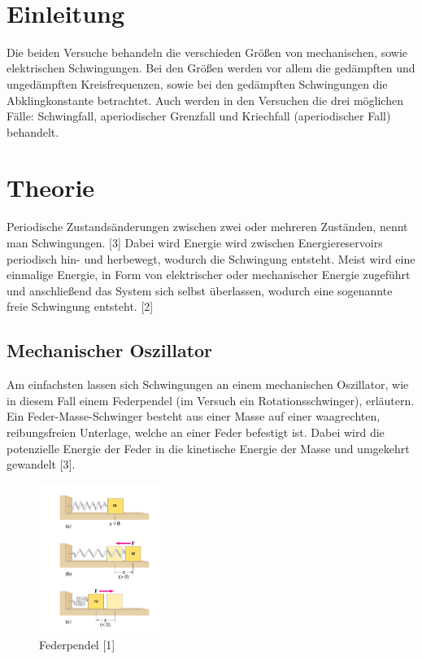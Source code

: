 \documentclass[a4paper]{scrartcl}
\def\header#1#2{
  \begin{center}
    {\Large #1}\\
    {#2}
  \end{center}
}
\numberwithin{equation}{subsection}
\begin{document}
\vspace{10pt}
\header{\HEADDING}{\SUBHEADDING}

\tableofcontents

\newpage

\section{Einleitung}
Die beiden Versuche behandeln die verschieden Größen von mechanischen, sowie elektrischen Schwingungen.
Bei den Größen werden vor allem die gedämpften und ungedämpften Kreisfrequenzen, sowie bei den gedämpften Schwingungen die Abklingkonstante betrachtet.
Auch werden in den Versuchen die drei möglichen Fälle: Schwingfall, aperiodischer Grenzfall und Kriechfall (aperiodischer Fall) behandelt.

\newpage

\section{Theorie}
Periodische Zustandsänderungen zwischen zwei oder mehreren Zuständen, nennt man Schwingungen. [3]
Dabei wird Energie wird zwischen Energiereservoirs periodisch hin- und herbewegt, wodurch die Schwingung entsteht.
Meist wird eine einmalige Energie, in Form von elektrischer oder
mechanischer Energie zugeführt und anschließend das System sich selbst überlassen, wodurch eine sogenannte freie Schwingung entsteht. [2]

\subsection{Mechanischer Oszillator}
Am einfachsten lassen sich Schwingungen an einem mechanischen Oszillator, wie in diesem Fall einem Federpendel (im Versuch ein Rotationsschwinger), erläutern. Ein Feder-Masse-Schwinger besteht aus einer Masse auf einer waagrechten, reibungsfreien Unterlage, welche an einer Feder befestigt ist. Dabei wird die potenzielle Energie der Feder in die kinetische Energie der Masse und umgekehrt gewandelt [3].

\begin{figure}[H]
\includegraphics[width=4cm]{Grafik_Federpendel}
\centering
\caption{Federpendel [1]}
\centering
\end{figure}
\end{document}
